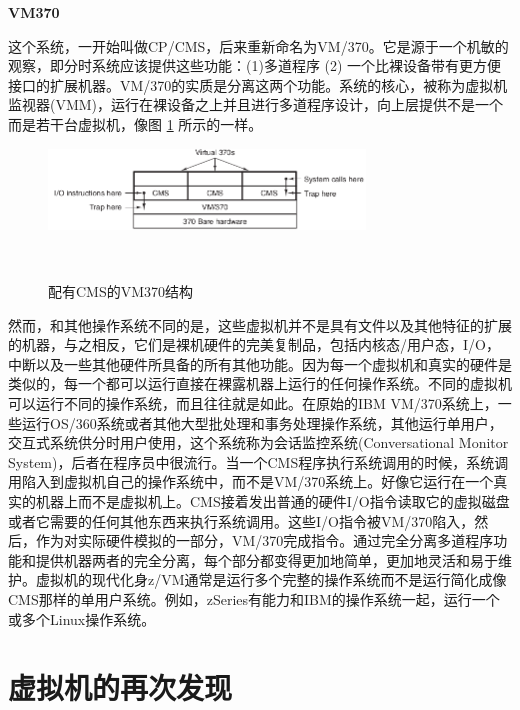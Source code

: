	\textbf{VM370}
	
	这个系统，一开始叫做CP/CMS，后来重新命名为VM/370。它是源于一个机敏的观察，即分时系统应该提供这些功能：(1)多道程序 (2) 一个比裸设备带有更方便接口的扩展机器。VM/370的实质是分离这两个功能。系统的核心，被称为虚拟机监视器(VMM)，运行在裸设备之上并且进行多道程序设计，向上层提供不是一个而是若干台虚拟机，像图 \ref{fig:vm370} 所示的一样。
	
    \begin{figure}[ht]\small
		\centering
		\includegraphics[width=0.75\textwidth]{FIG/1-28.png}
		\caption{配有CMS的VM370结构}　\label{fig:vm370}
	\end{figure}

	然而，和其他操作系统不同的是，这些虚拟机并不是具有文件以及其他特征的扩展的机器，与之相反，它们是裸机硬件的完美复制品，包括内核态/用户态，I/O，中断以及一些其他硬件所具备的所有其他功能。因为每一个虚拟机和真实的硬件是类似的，每一个都可以运行直接在裸露机器上运行的任何操作系统。不同的虚拟机可以运行不同的操作系统，而且往往就是如此。在原始的IBM VM/370系统上，一些运行OS/360系统或者其他大型批处理和事务处理操作系统，其他运行单用户，交互式系统供分时用户使用，这个系统称为会话监控系统(Conversational Monitor System)，后者在程序员中很流行。当一个CMS程序执行系统调用的时候，系统调用陷入到虚拟机自己的操作系统中，而不是VM/370系统上。好像它运行在一个真实的机器上而不是虚拟机上。CMS接着发出普通的硬件I/O指令读取它的虚拟磁盘或者它需要的任何其他东西来执行系统调用。这些I/O指令被VM/370陷入，然后，作为对实际硬件模拟的一部分，VM/370完成指令。通过完全分离多道程序功能和提供机器两者的完全分离，每个部分都变得更加地简单，更加地灵活和易于维护。虚拟机的现代化身z/VM通常是运行多个完整的操作系统而不是运行简化成像CMS那样的单用户系统。例如，zSeries有能力和IBM的操作系统一起，运行一个或多个Linux操作系统。
	
	\section{虚拟机的再次发现}
	
